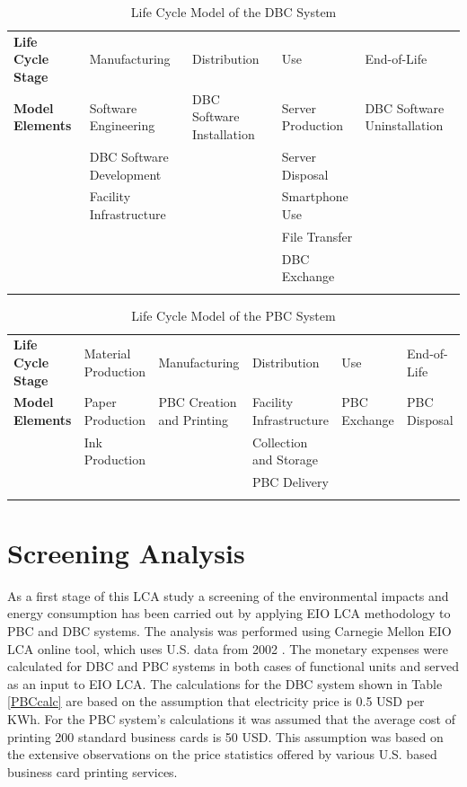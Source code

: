 \documentclass[3p,times,procedia]{elsarticle}
\begin{document}
\begin{table}[h]
\caption{Life Cycle Model of the DBC System}
\begin{tabular*}{\hsize}{@{\extracolsep{\fill}}lllll@{}}
\toprule
\textbf{Life Cycle Stage} & Manufacturing & Distribution & Use & End-of-Life\\
\colrule
\textbf{Model Elements} &   Software Engineering &  DBC Software Installation  & Server Production & DBC Software Uninstallation\\

 & DBC Software Development &   & Server Disposal  & \\
  &  Facility Infrastructure  &   & Smartphone Use &   \\
    &  &   & File Transfer &   \\
    &  &   & DBC Exchange &   \\
\botrule
\end{tabular*}
\label{DBCboundary}
\end{table}
\vspace{-0.6cm}
\begin{table}[h]
\caption{Life Cycle Model of the PBC System}
\begin{tabular*}{\hsize}{@{\extracolsep{\fill}}llllll@{}}
\toprule
\textbf{Life Cycle Stage} & Material Production & Manufacturing  & Distribution & Use & End-of-Life\\
\colrule
\textbf{Model Elements} &   Paper Production &  PBC Creation and Printing & Facility Infrastructure & PBC Exchange & PBC Disposal \\
 &  Ink Production &   & Collection and Storage &  &  \\
  &   &   & PBC Delivery &  &  \\
\botrule
\end{tabular*}
\label{PBCboundary}
\end{table}
\vspace{-0.4cm}
\section{Screening Analysis} \label{ScreeningLCA}

As a first stage of this LCA study a screening of the environmental impacts and energy consumption has been carried out by applying EIO LCA methodology to PBC and DBC systems. The analysis was performed using Carnegie Mellon EIO LCA online tool, which uses U.S. data from 2002 \cite{Mellon}. The monetary expenses were calculated for DBC and PBC systems in both cases of functional units and served as an input to EIO LCA. The calculations for the DBC system shown in Table \ref{PBCcalc} are based on the assumption that electricity price is 0.5 USD per KWh. For the PBC system's calculations it was assumed that the average cost of printing 200 standard business cards is 50 USD. This assumption was based on the extensive observations on the price statistics offered by various U.S. based business card printing services.
\end{document}
